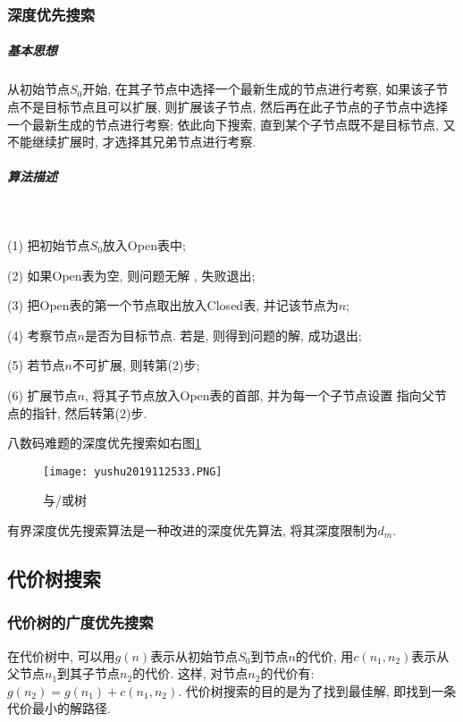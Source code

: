 \subsubsection{深度优先搜索}
\subparagraph{基本思想}
    从初始节点$S_0$开始, 在其子节点中选择一个最新生成的节点进行考察, 如果该子节点不是目标节点且可以扩展, 则扩展该子节点, 然后再在此子节点的子节点中选择一个最新生成的节点进行考察; 依此向下搜索, 直到某个子节点既不是目标节点, 又不能继续扩展时, 才选择其兄弟节点进行考察.
\subparagraph{算法描述}~{}

\quad   (1) 把初始节点$S_0$放入Open表中;

\quad   (2) 如果Open表为空, 则问题无解 , 失败退出;

\quad   (3) 把Open表的第一个节点取出放入Closed表, 并记该节点为$n$;

\quad   (4) 考察节点$n$是否为目标节点. 若是, 则得到问题的解, 成功退出;

\quad   (5) 若节点$n$不可扩展, 则转第(2)步;

\quad   (6) 扩展节点$n$, 将其子节点放入Open表的首部, 并为每一个子节点设置 指向父节点的指针, 然后转第(2)步.
\begin{example}
\end{example}

八数码难题的深度优先搜索如右图\ref{AI32fig33}
\begin{figure}[H]
\centering
\texttt{[image: yushu2019112533.PNG]}
\caption{与/或树 }
\label{AI32fig33}
\end{figure}
\begin{remark}
    有界深度优先搜索算法是一种改进的深度优先算法, 将其深度限制为$d_m$.
\end{remark}
\subsection{代价树搜索}
\subsubsection{代价树的广度优先搜索}
    在代价树中, 可以用$g(n)$表示从初始节点$S_0$到节点$n$的代价, 用$c(n_1, n_2)$表示从父节点$n_1$到其子节点$n_2$的代价.
这样, 对节点$n_2$的代价有: $g(n_2)=g(n_1)+c(n_1, n_2)$. 代价树搜索的目的是为了找到最佳解, 即找到一条代价最小的解路径.
